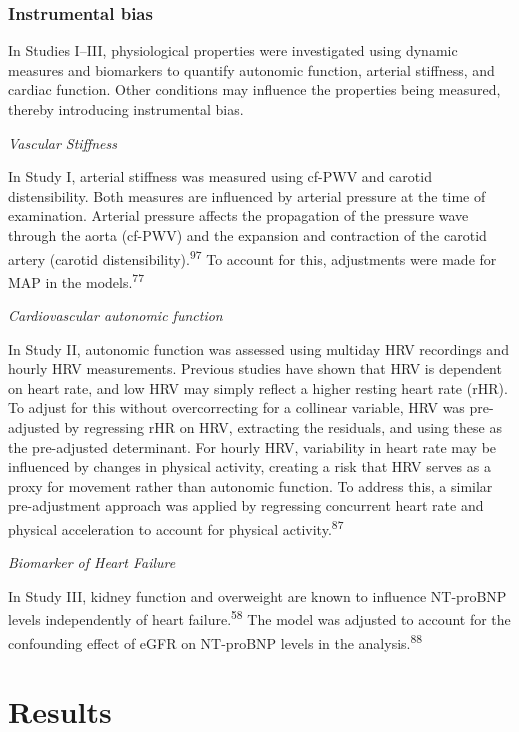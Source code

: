 \documentclass[
  letterpaper,
  headsepline=true,
  open=any]{scrbook}
\begin{document}
\hypertarget{instrumental-bias}{%
\subsection{Instrumental bias}\label{instrumental-bias}}

In Studies I--III, physiological properties were investigated using
dynamic measures and biomarkers to quantify autonomic function, arterial
stiffness, and cardiac function. Other conditions may influence the
properties being measured, thereby introducing instrumental bias.

\emph{Vascular Stiffness}

In Study I, arterial stiffness was measured using cf-PWV and carotid
distensibility. Both measures are influenced by arterial pressure at the
time of examination. Arterial pressure affects the propagation of the
pressure wave through the aorta (cf-PWV) and the expansion and
contraction of the carotid artery (carotid
distensibility).\textsuperscript{97} To account for this, adjustments
were made for MAP in the models.\textsuperscript{77}

\emph{Cardiovascular autonomic function}

In Study II, autonomic function was assessed using multiday HRV
recordings and hourly HRV measurements. Previous studies have shown that
HRV is dependent on heart rate, and low HRV may simply reflect a higher
resting heart rate (rHR). To adjust for this without overcorrecting for
a collinear variable, HRV was pre-adjusted by regressing rHR on HRV,
extracting the residuals, and using these as the pre-adjusted
determinant. For hourly HRV, variability in heart rate may be influenced
by changes in physical activity, creating a risk that HRV serves as a
proxy for movement rather than autonomic function. To address this, a
similar pre-adjustment approach was applied by regressing concurrent
heart rate and physical acceleration to account for physical
activity.\textsuperscript{87}

\emph{Biomarker of Heart Failure}

In Study III, kidney function and overweight are known to influence
NT-proBNP levels independently of heart failure.\textsuperscript{58} The
model was adjusted to account for the confounding effect of eGFR on
NT-proBNP levels in the analysis.\textsuperscript{88}


\hypertarget{results}{%
\chapter{Results}\label{results}}
\end{document}
